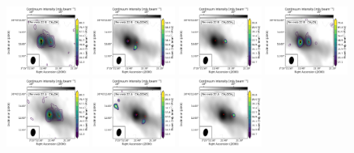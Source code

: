 \newpage\begin{figure}[htbp!]
  \centering
  \includegraphics[width=0.24\textwidth]{./moment0/Set1_ID03_2_CH3OH_243915.pdf}
  \includegraphics[width=0.24\textwidth]{./moment0/Set1_ID03_2_CH3OCHO_259342.pdf}
  \includegraphics[width=0.24\textwidth]{./moment0/Set1_ID03_2_CH3OCH3_259311.pdf}
  \includegraphics[width=0.24\textwidth]{./moment0/Set1_ID03_2_CH3CN_257527.pdf}
  \\
  \includegraphics[width=0.24\textwidth]{./moment0/Set1_ID03_CH3OH_243915.pdf}
  \includegraphics[width=0.24\textwidth]{./moment0/Set1_ID03_CH3OCHO_259342.pdf}
  \includegraphics[width=0.24\textwidth]{./moment0/Set1_ID03_CH3OCH3_259311.pdf}

\end{figure}

